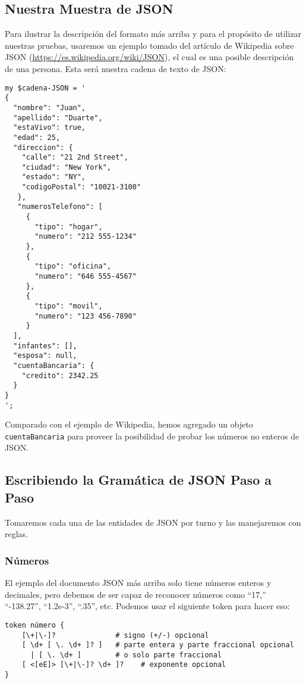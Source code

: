 \subsection{Nuestra Muestra de JSON}


Para ilustrar la descripción del formato más arriba y para
el propósito de utilizar nuestras pruebas, usaremos un ejemplo
tomado del artículo de Wikipedia sobre JSON
(\url{https://es.wikipedia.org/wiki/JSON}), el cual es una
posible descripción de una persona. Esta será nuestra cadena
de texto de JSON:

\begin{lstlisting}
my $cadena-JSON = '
{
  "nombre": "Juan",
  "apellido": "Duarte",
  "estaVivo": true,
  "edad": 25,
  "direccion": {
    "calle": "21 2nd Street",
	"ciudad": "New York",
	"estado": "NY",
	"codigoPostal": "10021-3100"
   },
   "numerosTelefono": [
     {
       "tipo": "hogar",
       "numero": "212 555-1234"
     },
     {
       "tipo": "oficina",
       "numero": "646 555-4567"
     },
     {
       "tipo": "movil",
       "numero": "123 456-7890"
     }
  ],
  "infantes": [],
  "esposa": null,  
  "cuentaBancaria": {
    "credito": 2342.25
  }
}
';
\end{lstlisting}

Comparado con el ejemplo de Wikipedia, hemos agregado
un objeto \verb|cuentaBancaria| para proveer la posibilidad
de probar los números no enteros de JSON.
 
\subsection{Escribiendo la Gramática de JSON Paso a Paso}

Tomaremos cada una de las entidades de JSON por turno y 
las manejaremos con reglas.

\subsubsection{Números}

El ejemplo del documento JSON más arriba solo tiene números enteros
y decimales, pero debemos de ser capaz de reconocer números
como ``17,'' ``-138.27'', ``1.2e-3'', ``.35'', etc. Podemos usar el
siguiente token para hacer eso:

\begin{lstlisting}
token número {
    [\+|\-]?              # signo (+/-) opcional
    [ \d+ [ \. \d+ ]? ]   # parte entera y parte fraccional opcional
      | [ \. \d+ ]        # o solo parte fraccional
    [ <[eE]> [\+|\-]? \d+ ]?    # exponente opcional
}
\end{lstlisting}

